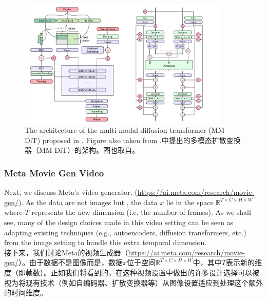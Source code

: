 \begin{figure}[!t]
    \centering
    \includegraphics[width=0.9\textwidth]{figures/mmdit.png}
    \caption{The architecture of the multi-modal diffusion transformer (MM-DiT) proposed in \citep{sd3}. Figure also taken from \citep{sd3}.\citep{sd3}中提出的多模态扩散变换器（MM-DiT）的架构。图也取自\citep{sd3}。}
    \label{fig:mmdit}
\end{figure}



\subsubsection{Meta Movie Gen Video}
Next, we discuss Meta's video generator,  (\url{https://ai.meta.com/research/movie-gen/}). As the data are not images but ,  the data $x$ lie in the space $\mathbb{R}^{T \times C \times H \times W}$ where $T$ represents the new  dimension (i.e. the number of frames). As we shall see, many of the design choices made in this video setting can be seen as adapting existing techniques (e.g., autoencoders, diffusion transformers, etc.) from the image setting to handle this extra temporal dimension.\\

接下来，我们讨论Meta的视频生成器（\url{https://ai.meta.com/research/movie-gen/}）。由于数据不是图像而是，数据$x$位于空间$\mathbb{R}^{T \times C \times H \times W}$中，其中$T$表示新的维度（即帧数）。正如我们将看到的，在这种视频设置中做出的许多设计选择可以被视为将现有技术（例如自编码器、扩散变换器等）从图像设置适应到处理这个额外的时间维度。\\

